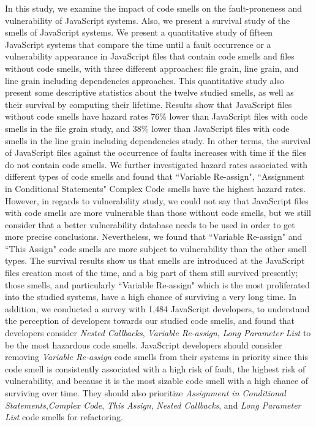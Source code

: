 In this study, we examine the impact of code smells on the fault-proneness {\color{blue} and vulnerability} of JavaScript systems. {\color{blue}Also, we present a survival study of the smells of JavaScript systems.} We present a quantitative study of {\color{blue}fifteen} JavaScript systems that compare the time until a fault occurrence {\color{blue}or a vulnerability appearance} in JavaScript files that contain code smells and files without code smells, {\color{blue}with three different approaches: file grain, line grain, and line grain including dependencies approaches}. {\color{blue}This quantitative study also present some descriptive statistics about the twelve studied smells, as well as their survival by computing their lifetime.} Results show that JavaScript files without code smells have hazard rates {\color{blue}76\%} lower than JavaScript files with code smells {\color{blue}in the file grain study, and 38\% lower than JavaScript files with code smells in the line grain including dependencies study}. In other terms, the survival of JavaScript files against the occurrence of faults increases with time if the files do not contain code smells. We further investigated hazard rates associated with different types of code smells and found that ``Variable Re-assign", ``Assignment in Conditional Statements" {\color{blue}Complex Code} smells have the highest hazard rates. {\color{blue} However, in regards to vulnerability study, we could not say that JavaScript files with code smells are more vulnerable than those without code smells, but we still consider that a better vulnerability database needs to be used in order to get more precise conclusions. Nevertheless, we found that ``Variable Re-assign" and ``This Assign" code smells are more subject to vulnerability than the other smell types. The survival results show us that smells are introduced at the JavaScript files creation most of the time, and a big part of them still survived presently; those smells, and particularly ``Variable Re-assign" which is the most proliferated into the studied systems, have a high chance of surviving a very long time.} In addition, we conducted a survey with 1,484 JavaScript developers, to understand the perception of developers towards our studied code smells, and found that developers consider \emph{Nested Callbacks}, \emph{Variable Re-assign}, \emph{Long Parameter List} to be the most hazardous code smells. JavaScript developers should consider removing \emph{Variable Re-assign} code smells from their systems in priority since this code smell is consistently associated with a high risk of fault, {\color{blue}the highest risk of vulnerability, and because it is the most sizable code smell with a high chance of surviving over time}. They should also prioritize \emph{Assignment in Conditional Statements},\emph{Complex Code}, \emph{This Assign}, \emph{Nested Callbacks}, and \emph{Long Parameter List} code smells for refactoring.

